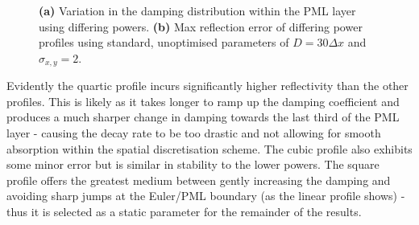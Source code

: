 \begin{figure}[h!]
    \centering
    \begin{subfigure}[h]{0.45\textwidth}
        \centering
        \caption{}
        \label{fig:VariedProfile}
    \end{subfigure}
    \hfill
    \begin{subfigure}[h]{0.49\textwidth}
        \centering
        \caption{}
        \label{fig:PMLProfile}
    \end{subfigure}
    \caption{\textbf{(a)} Variation in the damping distribution within the PML layer using differing powers. \textbf{(b)} Max reflection error of differing power profiles using standard, unoptimised parameters of $D=30\Delta x$ and $\sigma_{x,y}=2$.
    }
    \label{fig:PMLDistribution}
\end{figure}

\newpage

Evidently the quartic profile incurs significantly higher reflectivity than the other profiles. This is likely as it takes longer to ramp up the damping coefficient and produces a much sharper change in damping towards the last third of the PML layer - causing the decay rate to be too drastic and not allowing for smooth absorption within the spatial discretisation scheme. The cubic profile also exhibits some minor error but is similar in stability to the lower powers. The square profile offers the greatest medium between gently increasing the damping and avoiding sharp jumps at the Euler/PML boundary (as the linear profile shows) - thus it is selected as a static parameter for the remainder of the results.


